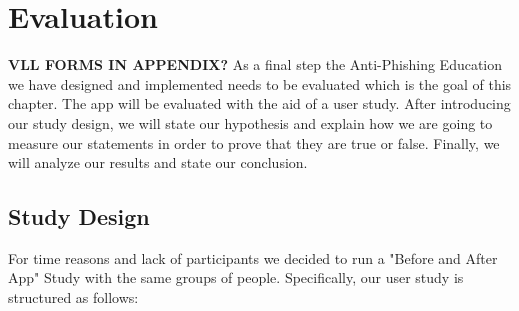 \section{Evaluation}
\label{s:evaluation}
\textbf{VLL FORMS IN APPENDIX? }As a final step the Anti-Phishing Education we have designed and implemented needs to be evaluated which is the goal of this chapter.
 The app will be evaluated with the aid of a user study.
 After introducing our study design, we will state our hypothesis and explain how we are going to measure our statements in order to prove that they are true or false.
 Finally, we will analyze our results and state our conclusion.




\subsection{Study Design}
For time reasons and lack of participants we decided to run a "Before and After App" Study with the same groups of people.
 Specifically, our user study is structured as follows:

